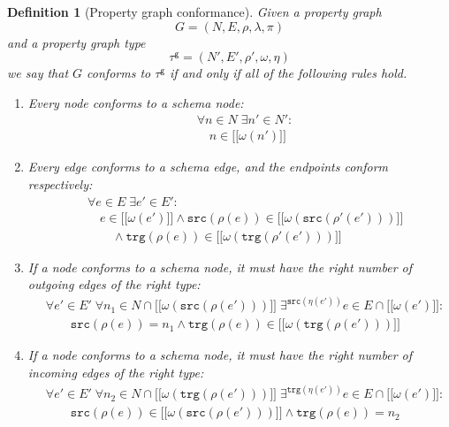 \documentclass[a4paper]{article}
\newtheorem{definition}[theorem]{Definition}
\newcommand{\src}{\mathtt{src}}
\newcommand{\trg}{\mathtt{trg}}
\newcommand{\gtype}{\tau^\mathsf{g}}
\newcommand{\lsem}{\ensuremath{[\![}}
\newcommand{\rsem}{\ensuremath{]\!]}}
\newcommand{\sem}[1]{\ensuremath{\lsem #1 \rsem}}
\begin{document}
\begin{definition}[Property graph conformance]
  Given a property graph $$G = (N, E, \rho, \lambda, \pi)$$ and a property graph type $$\gtype = (N', E', \rho', \omega, \eta)$$ we say that $G$ \emph{conforms} to $\gtype$ if and only if all of the following rules hold.

  \begin{enumerate}
    \item Every node conforms to a schema node:
    \begin{align*}
      &\forall n \in N \; \exists n' \in N' :\\
      &\quad n \in \sem{\omega(n')}
    \end{align*}
    
    \item Every edge conforms to a schema edge, and the endpoints conform respectively:
    \begin{align*}
      &\forall e \in E \; \exists e' \in E' :\\
      &\quad e \in \sem{\omega(e')} \wedge \src(\rho(e)) \in \sem{\omega(\src(\rho'(e')))}\\
      &\quad\quad\wedge \trg(\rho(e)) \in \sem{\omega(\trg(\rho'(e')))}
    \end{align*}
    
    \item If a node conforms to a schema node, it must have the right number of outgoing edges of the right type:
    \begin{align*}
      &\forall e' \in E' \; \forall n_1 \in N \cap \sem{\omega(\src(\rho(e')))} \; \exists^{\src(\eta(e'))} e \in E \cap \sem{\omega(e')} :\\
      &\quad\quad \src(\rho(e)) = n_1 \wedge \trg(\rho(e)) \in \sem{\omega(\trg(\rho(e')))}
    \end{align*}

    \item If a node conforms to a schema node, it must have the right number of incoming edges of the right type:
    \begin{align*}
      &\forall e' \in E' \; \forall n_2 \in N \cap \sem{\omega(\trg(\rho(e')))} \; \exists^{\trg(\eta(e'))} e \in E \cap \sem{\omega(e')} :\\
      &\quad\quad \src(\rho(e)) \in \sem{\omega(\src(\rho(e')))} \wedge \trg(\rho(e)) = n_2
    \end{align*}
  \end{enumerate}
\end{definition}
\end{document}
